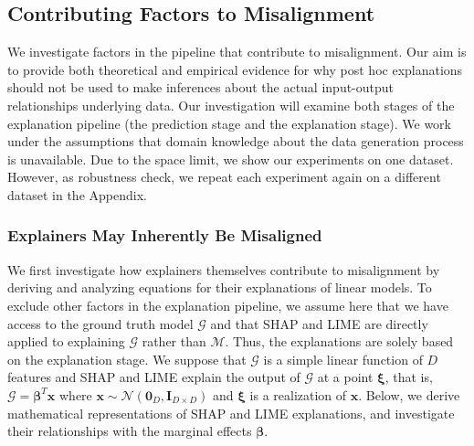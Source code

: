 \documentclass[12pt]{article}  %
\newcommand{\bI}{\mathbf{I}}
\begin{document}
    \subsection{Contributing Factors to  Misalignment}
        \label{sec:causes_of_misalignment}
        We investigate factors in the pipeline that contribute to misalignment. Our aim is to provide both theoretical and empirical evidence for why post hoc explanations should not be used to make inferences about the actual input-output relationships underlying data. Our investigation will examine both stages of the explanation pipeline (the prediction stage and the explanation stage). %
        We work under the assumptions that domain knowledge about the data generation process is unavailable. Due to the space limit, we show our experiments on one dataset. However, as robustness check, we repeat each experiment again on a different dataset in the Appendix. %


    \subsubsection{Explainers May Inherently Be Misaligned}
    \label{sec:theoretical_considerations}
   We first investigate how explainers themselves contribute to misalignment by deriving and analyzing equations for their explanations of linear models. To exclude other factors in the explanation pipeline, we assume here that we have access to the ground truth model $\mathcal{G}$ and that SHAP and LIME are directly applied to explaining $\mathcal{G}$ rather than $\mathcal{M}$. Thus, the explanations are solely based on the explanation stage. We suppose that $\mathcal{G}$ is a simple linear function of $D$ features and SHAP and LIME explain the output of $\mathcal{G}$ at a point $\boldsymbol{\xi}$, that is, $\mathcal{G} = \boldsymbol{\beta}^T \mathbf{x}$ where $\mathbf{x} \sim \mathcal{N}(\mathbf{0}_D,\bI_{D\times D})$ and $\boldsymbol{\xi}$ is a realization of $\mathbf{x}$. Below, we derive mathematical representations of SHAP and LIME explanations, and investigate their relationships with the marginal effects $\boldsymbol{\beta}$.
\end{document}
